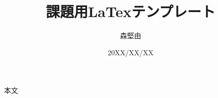 \documentclass{ltjsarticle}
\begin{document}
\title{課題用LaTexテンプレート}
\author{森堅由}
\date{20XX/XX/XX}
\maketitle

本文
\end{document}

